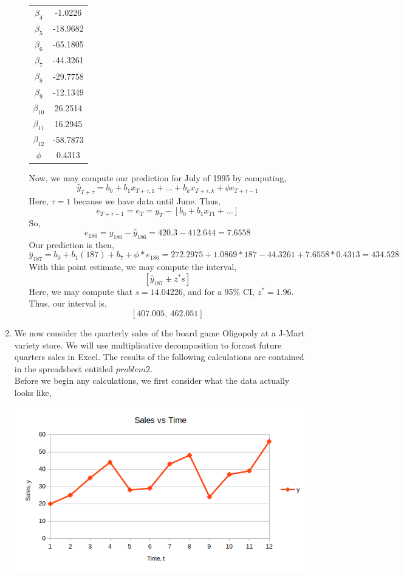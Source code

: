 \documentclass[letterpaper,10pt]{article}
\begin{document}
\begin{enumerate}
\begin{enumerate}
\begin{center}
\begin{tabular}{|c|c|}
$\beta_4$ & -1.0226\\
$\beta_5$ & -18.9682\\
$\beta_6$ & -65.1805\\
$\beta_7$ & -44.3261\\
$\beta_8$ & -29.7758\\
$\beta_9$ & -12.1349\\
$\beta_{10}$ & 26.2514\\
$\beta_{11}$ & 16.2945\\
$\beta_{12}$ & -58.7873\\
$\phi$ & 0.4313\\\hline
\end{tabular}
\end{center}
Now, we may compute our prediction for July of 1995 by computing,
\[\hat{y}_{T+\tau} = b_0+b_1x_{T+\tau,1}+\ldots+b_kx_{T+\tau,k}+\phi e_{T+\tau-1}\]
Here, $\tau=1$ because we have data until June. Thus,
\[e_{T+\tau-1}=e_T=y_T-[b_0+b_1x_{T1}+\ldots]\]
So,
\[e_{186}=y_{186}-\hat{y}_{186}=420.3-412.644=7.6558\]
Our prediction is then,
\[\hat{y}_{187}=b_0+b_1(187)+b_7+\phi*e_{186}=272.2975+1.0869*187-44.3261+7.6558*0.4313=434.528\]
With this point estimate, we may compute the interval,
\[[\hat{y}_{187}\pm z^*s]\]
Here, we may compute that $s=14.04226$, and for a 95\% CI, $z^*=1.96$. Thus, our interval is,
\[[407.005,\ 462.051]\]
\end{enumerate}
\item We now consider the quarterly sales of the board game Oligopoly at a J-Mart variety store. We will use multiplicative decomposition to forcast future quarters sales in Excel. The results of the following calculations are contained in the spreadsheet entitled $problem2$.\\
Before we begin any calculations, we first consider what the data actually looks like,
\begin{center}
\includegraphics[scale=0.8]{oligopoly.png}

\end{center}
\end{enumerate}
\end{document}
